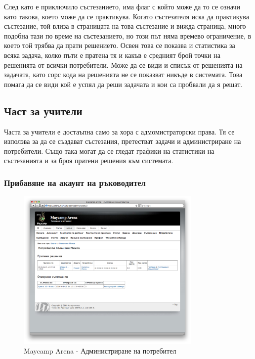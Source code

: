 \documentclass[a4paper,12pt]{article}
\begin{document}
  След като е приключило състезанието, има флаг с който може да то се означи като такова, което може да се практикува. Когато състезателя иска да практикува състезание, той влиза в страницата на това състезание и вижда страница, много подобна тази по време на състезанието, но този път няма времево ограничение, в което той трябва да прати решението. Освен това се показва и статистика за всяка задача, колко пъти е пратена тя и какъв е средният брой точки на решенията от всички потребители. Може да се види и списък от решенията на задачата, като сорс кода на решенията не се показват никъде в системата. Това помага да се види кой е успял да реши задачата и кои са пробвали да я решат.
  
  \subsection{Част за учители}

  Часта за учители е достаъпна само за хора с адмомистраторски права. Тя се използва за да се създават състезания, претестват задачи и администриране на потребители. Също така могат да се гледат графики на статистики на състезанията и за броя пратени решения към системата.
  
  \subsubsection{Прибавяне на акаунт на ръководител}

  \begin{figure}[ht]
    \begin{center}
      \includegraphics[width=0.8\textwidth]{images/maycamp_arena_admin_user.png}
    \end{center}
    \caption{Maycamp Arena - Администриране на потребител}
    \label{arena_admin_user}
  \end{figure}
\end{document}

